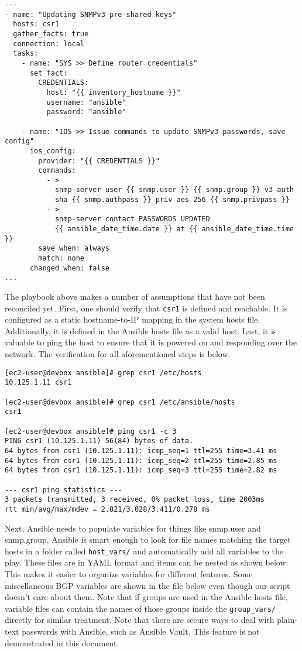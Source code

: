 \begin{verbatim}
---
- name: "Updating SNMPv3 pre-shared keys"
  hosts: csr1
  gather_facts: true
  connection: local
  tasks:
    - name: "SYS >> Define router credentials"
      set_fact:
        CREDENTIALS:
          host: "{{ inventory_hostname }}" 
          username: "ansible"
          password: "ansible"

    - name: "IOS >> Issue commands to update SNMPv3 passwords, save config"
      ios_config:
        provider: "{{ CREDENTIALS }}"
        commands:
          - >
            snmp-server user {{ snmp.user }} {{ snmp.group }} v3 auth
            sha {{ snmp.authpass }} priv aes 256 {{ snmp.privpass }}
          - >
            snmp-server contact PASSWORDS UPDATED
            {{ ansible_date_time.date }} at {{ ansible_date_time.time }}
        save_when: always
        match: none
      changed_when: false
...
\end{verbatim}

The playbook above makes a number of assumptions that have not been reconciled
yet. First, one should verify that \verb|csr1| is defined and reachable. It is
configured as a static hostname-to-IP mapping in the system hosts file.
Additionally, it is defined in the Ansible hosts file as a valid host. Last,
it is valuable to ping the host to ensure that it is powered on and responding
over the network. The verification for all aforementioned steps is below.

\begin{verbatim}
[ec2-user@devbox ansible]# grep csr1 /etc/hosts
10.125.1.11 csr1

[ec2-user@devbox ansible]# grep csr1 /etc/ansible/hosts
csr1

[ec2-user@devbox ansible]# ping csr1 -c 3
PING csr1 (10.125.1.11) 56(84) bytes of data.
64 bytes from csr1 (10.125.1.11): icmp_seq=1 ttl=255 time=3.41 ms
64 bytes from csr1 (10.125.1.11): icmp_seq=2 ttl=255 time=2.85 ms
64 bytes from csr1 (10.125.1.11): icmp_seq=3 ttl=255 time=2.82 ms

--- csr1 ping statistics ---
3 packets transmitted, 3 received, 0% packet loss, time 2003ms
rtt min/avg/max/mdev = 2.821/3.028/3.411/0.278 ms
\end{verbatim}

Next, Ansible needs to populate variables for things like snmp.user and
snmp.group. Ansible is smart enough to look for file names matching the target
hosts in a folder called \verb|host_vars/| and automatically add all variables
to the play. These files are in YAML format and items can be nested as shown
below. This makes it easier to organize variables for different features. Some
miscellaneous BGP variables are shown in the file below even though our script
doesn't care about them. Note that if groups are used in the Ansible hosts
file, variable files can contain the names of those groups inside the
\verb|group_vars/| directly for similar treatment. Note that there are secure
ways to deal with plain-text passwords with Ansible, such as Ansible Vault.
This feature is not demonstrated in this document.

